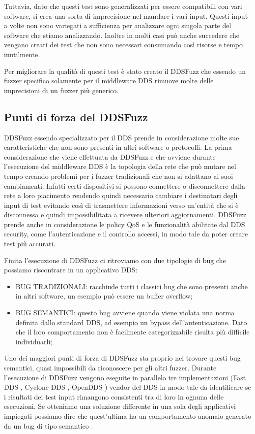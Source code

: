 Tuttavia, dato che questi test sono generalizzati per essere compatibili
con vari software, si crea una sorta di imprecisione nel mandare i vari 
input. Questi input a volte non sono variegati a sufficienza 
per analizzare ogni singola parte del software che stiamo analizzando.
Inoltre in molti casi può anche succedere che vengano creati
dei test che non sono necessari consumando
così risorse e tempo inutilmente.

Per migliorare la qualità di questi test è stato 
creato il DDSFuzz che essendo un fuzzer specifico solamente per 
il middleware DDS rimuove molte delle imprecisioni di un fuzzer 
più generico.

\subsection{Punti di forza del DDSFuzz}
DDSFuzz essendo specializzato per il DDS prende in considerazione 
molte sue caratteristiche che non sono presenti in altri software
o protocolli. La prima considerazione che viene 
effettuata da DDSFuzz e 
che avviene durante l'esecuzione del middleware DDS è
la topologia della rete che può mutare nel tempo creando problemi per i
fuzzer tradizionali che non si adattano ai suoi cambiamenti. Infatti certi
dispositivi si possono connettere o disconnettere dalla rete a loro 
piacimento rendendo quindi necessario cambiare i destinatari 
degli input di test 
evitando così di trasmettere informazioni verso un'entità 
che si è disconnessa e quindi impossibilitata a ricevere ulteriori
aggiornamenti. DDSFuzz prende anche in considerazione le
policy QoS e 
le funzionalità abilitate dal DDS security, come
l'autenticazione e il controllo accessi, in modo tale da
poter creare test più accurati. 

Finita l'esecuzione di DDSFuzz ci ritroviamo con due tipologie
di bug che possiamo riscontrare in un applicativo DDS:
\begin{itemize}
    \item BUG TRADIZIONALI: racchiude tutti i classici bug 
    che sono presenti anche in altri software, un esempio può 
    essere un buffer overflow;
    \item BUG SEMANTICI: questo bug avviene quando viene violata
    una norma definita dallo standard DDS,
    ad esempio un bypass dell'autenticazione. 
    Dato che il loro comportamento
    non è facilmente categorizzabile risulta più difficile individuarli;
\end{itemize}
Uno dei maggiori punti di forza di DDSFuzz sta proprio nel trovare
questi bug semantici, quasi impossibili da riconoscere per gli altri 
fuzzer. Durante l'esecuzione di DDSFuzz vengono eseguite in parallelo 
tre implementazioni (Fast DDS \cite{FastDDS}, Cyclone DDS \cite{CycloneDDS}, 
OpenDDS \cite{OpenDDS1}) vendor 
del DDS in modo tale da identificare
se i risultati dei test input rimangono consistenti tra di loro in 
ognuna delle esecuzioni. 
Se otteniamo una soluzione differente in una sola 
degli applicativi impiegati possiamo dire che quest'ultima ha un 
comportamento anomalo generato da un bug di tipo semantico 
\cite{10.1145/3691620.3695073}. 

